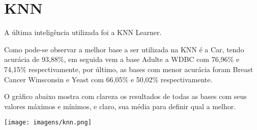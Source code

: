 \section{KNN}
\label{sec:arvore}

A última inteligência utilizada foi a KNN Learner.

Como pode-se observar a melhor base a ser utilizada na KNN é a Car, tendo acurácia de 93,88\%, em seguida vem a base Adulte a WDBC com 76,96\% e 74,15\% respectivamente, por último, as bases com menor acurácia foram Breast Cancer Winsconsin e Yeast com 66,05\% e 50,02\% respectivamente.

O gráfico abaixo mostra com clareza os resultados de todas as bases com seus valores máximos e mínimos, e claro, sua média para definir qual a melhor.

\begin{center}
      \texttt{[image: imagens/knn.png]}
\end{center}